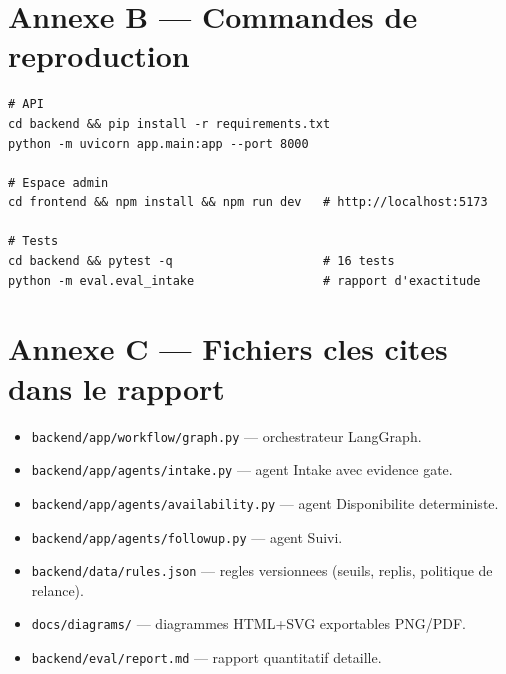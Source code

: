 \documentclass[12pt,a4paper,openany]{report}
\begin{document}
\section*{Annexe B --- Commandes de reproduction}
\begin{lstlisting}
# API
cd backend && pip install -r requirements.txt
python -m uvicorn app.main:app --port 8000

# Espace admin
cd frontend && npm install && npm run dev   # http://localhost:5173

# Tests
cd backend && pytest -q                     # 16 tests
python -m eval.eval_intake                  # rapport d'exactitude
\end{lstlisting}

\section*{Annexe C --- Fichiers cles cites dans le rapport}
\begin{itemize}[leftmargin=1.5cm]
\item \texttt{backend/app/workflow/graph.py} --- orchestrateur LangGraph.
\item \texttt{backend/app/agents/intake.py} --- agent Intake avec evidence gate.
\item \texttt{backend/app/agents/availability.py} --- agent Disponibilite deterministe.
\item \texttt{backend/app/agents/followup.py} --- agent Suivi.
\item \texttt{backend/data/rules.json} --- regles versionnees (seuils, replis, politique de relance).
\item \texttt{docs/diagrams/} --- diagrammes HTML+SVG exportables PNG/PDF.
\item \texttt{backend/eval/report.md} --- rapport quantitatif detaille.
\end{itemize}
\end{document}
